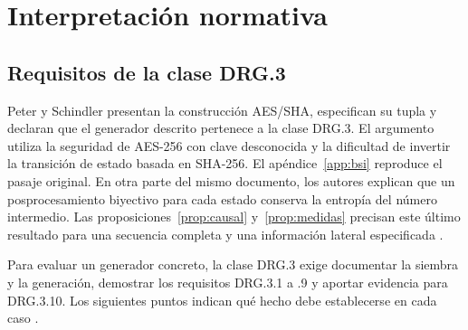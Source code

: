 \documentclass[11pt,a4paper]{article}
\begin{document}
\section{Interpretación normativa}\label{sec:norma}
\subsection{Requisitos de la clase DRG.3}
Peter y Schindler presentan la construcción AES/SHA, especifican su tupla y declaran que el generador descrito pertenece a la clase DRG.3. El argumento utiliza la seguridad de AES-256 con clave desconocida y la dificultad de invertir la transición de estado basada en SHA-256. El apéndice~\ref{app:bsi} reproduce el pasaje original. En otra parte del mismo documento, los autores explican que un posprocesamiento biyectivo para cada estado conserva la entropía del número intermedio. Las proposiciones~\ref{prop:causal} y~\ref{prop:medidas} precisan este último resultado para una secuencia completa y una información lateral especificada \cite[párrs.~397(ii) y 996--998]{ais}.

Para evaluar un generador concreto, la clase DRG.3 exige documentar la siembra y la generación, demostrar los requisitos DRG.3.1 a .9 y aportar evidencia para DRG.3.10. Los siguientes puntos indican qué hecho debe establecerse en cada caso \cite[párrs.~205--207]{ais}.
\end{document}
